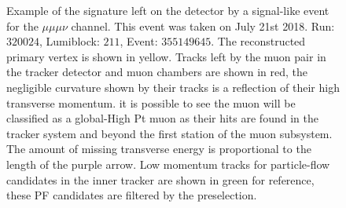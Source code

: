 \begin{figure}
  \centering
  \vfil
  \caption{Example of the signature left on the detector by a signal-like event
    for the $\mu\mu\mu\nu$ channel. This event was taken on July 21st 2018.
    Run: $320024$, Lumiblock: $211$, Event: $355149645$. The reconstructed primary vertex is shown in yellow.
    Tracks left by the muon pair in the tracker detector and muon chambers are shown in red,
    the negligible curvature shown by their tracks is a reflection of their high transverse momentum.
    it is possible to see the muon will be classified as a global-High Pt muon as their hits
    are found in the tracker system and beyond the first station of the muon subsystem.
    The amount of missing
    transverse energy is proportional to the length of the purple arrow. Low momentum
    tracks for particle-flow candidates in the inner tracker are shown in green for
    reference, these PF candidates are filtered by the preselection. }
  \label{fig:Fireworks_mumumuv}
\end{figure}



